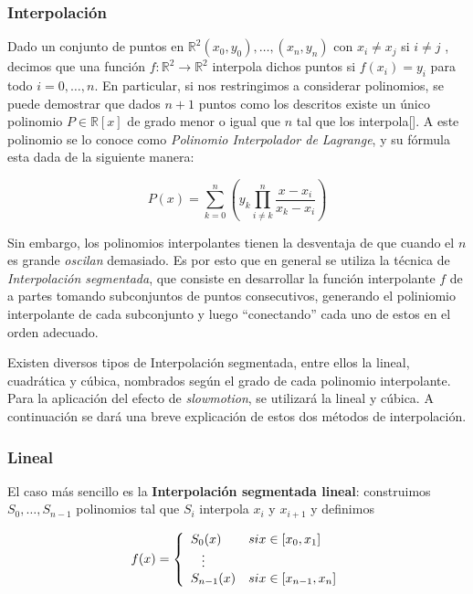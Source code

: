 \subsubsection{Interpolación}
Dado un conjunto de puntos en $\mathbb{R}^2 (x_0, y_0), \ldots, (x_n, y_n)$ con $x_i \neq x_j$ si $i \neq j$ , decimos que una función $f:\mathbb{R}^2 \rightarrow \mathbb{R}^2$ interpola dichos puntos si $f(x_i) = y_i$ para todo $i = 0, \ldots, n$. En particular, si nos restringimos a considerar polinomios, se puede demostrar que dados $n + 1$ puntos como los descritos existe un único polinomio $P \in \mathbb{R}[x]$ de grado menor o igual que $n$ tal que los interpola[\cite{wiki_lagrange_polynomial}]. A este polinomio se lo conoce como \emph{Polinomio Interpolador de Lagrange}, y su fórmula esta dada de la siguiente manera:

\[P(x) = \sum_{k = 0}^n \left(y_k \prod_{i \neq k}^n \frac{x - x_i}{x_k - x_i}\right)\]

Sin embargo, los polinomios interpolantes tienen la desventaja de que cuando el $n$ es grande \emph{oscilan} demasiado. Es por esto que en general se utiliza la técnica de \emph{Interpolación segmentada}, que consiste en desarrollar la función interpolante $f$ de a partes tomando subconjuntos de puntos consecutivos, generando el poliniomio interpolante de cada subconjunto y luego ``conectando'' cada uno de estos en el orden adecuado.

Existen diversos tipos de Interpolaci\'on segmentada, entre ellos la lineal, cuadr\'atica y c\'ubica, nombrados según el grado de cada polinomio interpolante. Para la aplicaci\'on del efecto de \emph{slowmotion}, se utilizar\'a la lineal y c\'ubica. A continuaci\'on se dar\'a una breve explicaci\'on de estos dos m\'etodos de interpolaci\'on. 

\subsubsection{Lineal}

El caso m\'as sencillo es la \textbf{Interpolación segmentada lineal}: construimos $S_0, \ldots, S_{n - 1}$ polinomios tal que $S_i$ interpola $x_i$ y $x_{i + 1}$ y definimos

\[
f(x) = 
\left\{
    \begin{array}{ll}
        S_0(x)  & \mbox{si } x \in [x_{0}, x_1] \\
        \hspace{0.3cm}\vdots \\     
        S_{n - 1}(x) & \mbox{si } x \in [x_{n - 1}, x_n]
    \end{array}
\right.
\]

